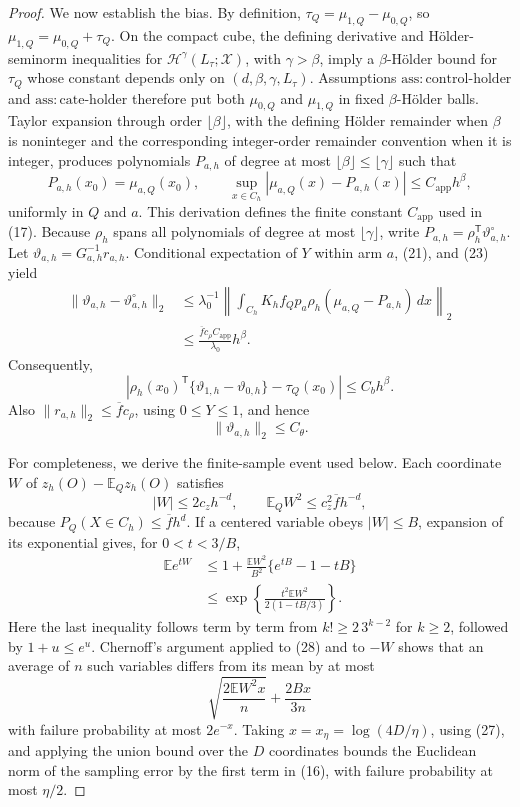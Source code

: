 \documentclass{article}
\begin{document}
\begin{proof}
We now establish the bias.  By definition, \(\tau_Q=\mu_{1,Q}-\mu_{0,Q}\), so \(\mu_{1,Q}=\mu_{0,Q}+\tau_Q\).  On the compact cube, the defining derivative and H\"older-seminorm inequalities for \(\mathcal H^\gamma(L_\tau;\mathcal X)\), with \(\gamma>\beta\), imply a \(\beta\)-H\"older bound for \(\tau_Q\) whose constant depends only on \((d,\beta,\gamma,L_\tau)\).  Assumptions \(\mathrm{ass{:}control\text{-}holder}\) and \(\mathrm{ass{:}cate\text{-}holder}\) therefore put both \(\mu_{0,Q}\) and \(\mu_{1,Q}\) in fixed \(\beta\)-H\"older balls.  Taylor expansion through order \(\lfloor\beta\rfloor\), with the defining H\"older remainder when \(\beta\) is noninteger and the corresponding integer-order remainder convention when it is integer, produces polynomials \(P_{a,h}\) of degree at most \(\lfloor\beta\rfloor\le\lfloor\gamma\rfloor\) such that
\[
 P_{a,h}(x_0)=\mu_{a,Q}(x_0),
 \qquad
 \sup_{x\in C_h}|\mu_{a,Q}(x)-P_{a,h}(x)|
 \le C_{\mathrm{app}}h^\beta,
\tag{23}
\]
uniformly in \(Q\) and \(a\).  This derivation defines the finite constant \(C_{\mathrm{app}}\) used in (17).  Because \(\rho_h\) spans all polynomials of degree at most \(\lfloor\gamma\rfloor\), write \(P_{a,h}=\rho_h^{\mathsf T}\vartheta_{a,h}^\circ\).  Let \(\vartheta_{a,h}=G_{a,h}^{-1}r_{a,h}\).  Conditional expectation of \(Y\) within arm \(a\), (21), and (23) yield
\[
 \begin{aligned}
 \|\vartheta_{a,h}-\vartheta_{a,h}^\circ\|_2
 &\le\lambda_0^{-1}
 \left\|\int_{C_h}K_hf_Qp_a\rho_h(\mu_{a,Q}-P_{a,h})\,dx\right\|_2\\
 &\le \frac{\overline f c_\rho C_{\mathrm{app}}}{\lambda_0}h^\beta.
 \end{aligned}
\tag{24}
\]
Consequently,
\[
 \left|\rho_h(x_0)^{\mathsf T}
 \{\vartheta_{1,h}-\vartheta_{0,h}\}-\tau_Q(x_0)\right|
 \le C_bh^\beta.
\tag{25}
\]
Also \(\|r_{a,h}\|_2\le\overline f c_\rho\), using \(0\le Y\le1\), and hence
\[
 \|\vartheta_{a,h}\|_2\le C_\theta.
\tag{26}
\]

For completeness, we derive the finite-sample event used below.  Each coordinate \(W\) of \(z_h(O)-\mathbb E_Qz_h(O)\) satisfies
\[
 |W|\le2c_zh^{-d},
 \qquad
 \mathbb E_QW^2\le c_z^2\overline f h^{-d},
\tag{27}
\]
because \(P_Q(X\in C_h)\le\overline f h^d\).  If a centered variable obeys \(|W|\le B\), expansion of its exponential gives, for \(0<t<3/B\),
\[
 \begin{aligned}
 \mathbb E e^{tW}
 &\le1+\frac{\mathbb EW^2}{B^2}\{e^{tB}-1-tB\}\\
 &\le\exp\left\{\frac{t^2\mathbb EW^2}{2(1-tB/3)}\right\}.
 \end{aligned}
\tag{28}
\]
Here the last inequality follows term by term from \(k!\ge2\,3^{k-2}\) for \(k\ge2\), followed by \(1+u\le e^u\).  Chernoff's argument applied to (28) and to \(-W\) shows that an average of \(n\) such variables differs from its mean by at most
\[
 \sqrt{\frac{2\mathbb EW^2x}{n}}+\frac{2Bx}{3n}
\tag{29}
\]
with failure probability at most \(2e^{-x}\).  Taking \(x=x_\eta=\log(4D/\eta)\), using (27), and applying the union bound over the \(D\) coordinates bounds the Euclidean norm of the sampling error by the first term in (16), with failure probability at most \(\eta/2\).


\end{proof}
\end{document}
